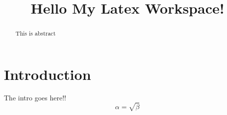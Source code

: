 \documentclass{article}
\begin{document}
\title{Hello My Latex Workspace!}
\maketitle
\begin{abstract}
This is abstract
\end{abstract}
\section{Introduction}
The intro goes here!!
\begin{equation}
\alpha=\sqrt{\beta}
\end{equation}
\end{document}
